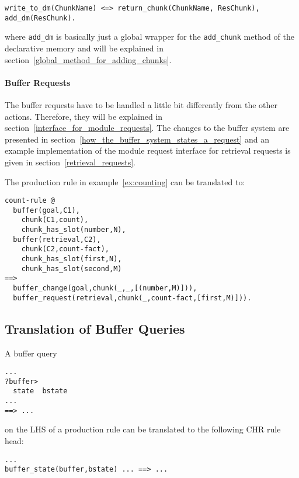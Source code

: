 \begin{lstlisting}
write_to_dm(ChunkName) <=> return_chunk(ChunkName, ResChunk), add_dm(ResChunk).
\end{lstlisting}

where \verb|add_dm| is basically just a global wrapper for the \verb|add_chunk| method of the declarative memory and will be explained in section~\ref{global_method_for_adding_chunks}.

\paragraph{Buffer Requests} The buffer requests have to be handled a little bit differently from the other actions. Therefore, they will be explained in section~\ref{interface_for_module_requests}. The changes to the buffer system are presented in section~\ref{how_the_buffer_system_states_a_request} and an example implementation of the module request interface for retrieval requests is given in section~\ref{retrieval_requests}.


\begin{example}
The production rule in example~\ref{ex:counting} can be translated to:

\begin{lstlisting}
count-rule @
  buffer(goal,C1), 
    chunk(C1,count),
    chunk_has_slot(number,N),
  buffer(retrieval,C2),
    chunk(C2,count-fact),
    chunk_has_slot(first,N),
    chunk_has_slot(second,M)
==>
  buffer_change(goal,chunk(_,_,[(number,M)])),
  buffer_request(retrieval,chunk(_,count-fact,[first,M)])).
\end{lstlisting}

\end{example}


\subsection{Translation of Buffer Queries}

A buffer query

\begin{lstlisting}
...
?buffer>
  state  bstate 
...
==> ...
\end{lstlisting}

on the LHS of a production rule can be translated to the following CHR rule head:

\begin{lstlisting}
...
buffer_state(buffer,bstate) ... ==> ...
\end{lstlisting}

